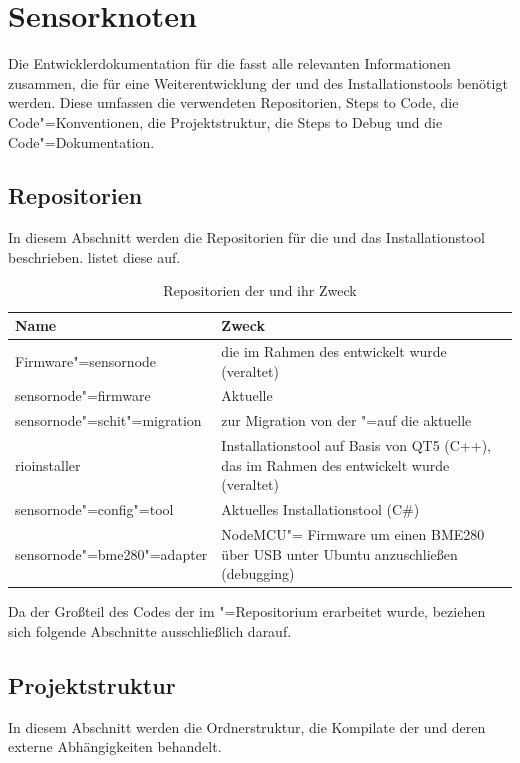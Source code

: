\section{Sensorknoten}
Die Entwicklerdokumentation für die \skk fasst alle relevanten Informationen zusammen, die für eine Weiterentwicklung der \skfw und des Installationstools benötigt werden.
Diese umfassen die verwendeten Repositorien, Steps to Code, die Code"=Konventionen, die Projektstruktur, die Steps to Debug und die Code"=Dokumentation.

\subsection{Repositorien}
In diesem Abschnitt werden die Repositorien für die \skfw und das Installationstool beschrieben.
  listet diese auf.

\begin{table}[htb]
	\caption{Repositorien der \skk und ihr Zweck}
	\begin{tabular}{|p{45mm}|p{93mm}|}
		\hline
		Name & Zweck \\ \hline
		Firmware"=sensornode & \skfw die im Rahmen des \schit entwickelt wurde (veraltet) \\ \hline
		sensornode"=firmware & Aktuelle \skfw \\ \hline
		sensornode"=schit"=migration & \skfw zur Migration von der \schit"=\skfw auf die aktuelle \skfw \\ \hline
		rioinstaller & Installationstool auf Basis von QT5 (C++), das im Rahmen des \schit entwickelt wurde (veraltet) \\ \hline
		sensornode"=config"=tool & Aktuelles Installationstool (C\#) \\ \hline
		sensornode"=bme280"=adapter & NodeMCU"= Firmware um einen BME280 über USB unter Ubuntu anzuschließen (debugging) \\ \hline
	\end{tabular}
	\label{tbl:skfwrepos}
\end{table}

Da der Großteil des Codes der \skk im "=Repositorium erarbeitet wurde, beziehen sich folgende Abschnitte ausschließlich darauf.

\subsection{Projektstruktur}
In diesem Abschnitt werden die Ordnerstruktur, die Kompilate der \skk und deren externe Abhängigkeiten behandelt.

